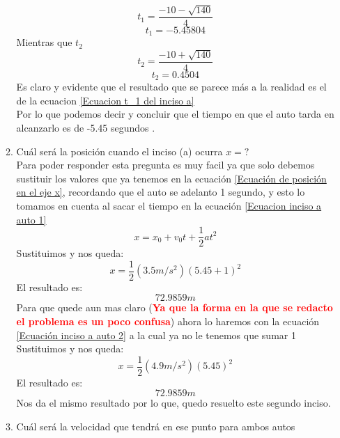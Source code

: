 \documentclass[letterpaper, 12pt]{article}
\begin{document}
\begin{enumerate}
\begin{enumerate}
\begin{equation}
    t_1 = \frac{- 10 - \sqrt{140}}{4}
\end{equation}
\begin{equation}
\label{Ecuacion t_1 del inciso a}
    t_1 = -5.45804
\end{equation}
Mientras que $t_2$
\begin{equation}
    t_2 = \frac{- 10 + \sqrt{140}}{4}
\end{equation}
\begin{equation}
    t_2 = 0.4504
\end{equation}
Es claro y evidente que el resultado que se parece más a la realidad es el de la ecuacion \ref{Ecuacion t_1 del inciso a}\\
Por lo que podemos decir y concluir que el tiempo en que el auto tarda en alcanzarlo es de -5.45 segundos .

    \item Cuál será la posición cuando el inciso (a) ocurra $x=?$\\
Para poder responder esta pregunta es muy facil ya que solo debemos sustituir los valores que ya tenemos en la ecuación \ref{Ecuación de posición en el eje x}, recordando que el auto se adelanto 1 segundo, y esto lo tomamos en cuenta al sacar el tiempo en la ecuación \ref{Ecuacion inciso a auto 1}
    \begin{equation}
    x=x_0 + v_0 t + \frac{1}{2} at^2
    \end{equation}
Sustituimos y nos queda:
    \begin{equation}
    x= \frac{1}{2} (3.5m/s^2)(5.45+1)^2
    \end{equation}
El resultado es:
\begin{equation}
    72.9859m
\end{equation}
Para que quede aun mas claro (\textbf{\textcolor{red}{Ya que la forma en la que se redacto el problema es un poco confusa}}) ahora lo haremos con la ecuación \ref{Ecuación inciso a auto 2} a la cual ya no le tenemos que sumar 1
Sustituimos y nos queda:
    \begin{equation}
    x= \frac{1}{2} (4.9m/s^2)(5.45)^2
    \end{equation}
El resultado es:
\begin{equation}
    72.9859m
\end{equation}
Nos da el mismo resultado por lo que, quedo resuelto este segundo inciso.

    \item Cuál será la velocidad que tendrá en ese punto para ambos autos
    

\end{enumerate}
\end{enumerate}
\end{document}

